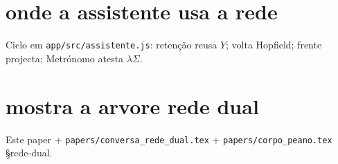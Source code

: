 \documentclass[11pt,a4paper]{article}
\newcommand{\code}[1]{\texttt{\small #1}}
\begin{document}
\section{onde a assistente usa a rede}
Ciclo em \code{app/src/assistente.js}: retenção reusa $Y$; volta Hopfield;
frente projecta; Metrónomo atesta $\lambda\Sigma$.

\section{mostra a arvore rede dual}
Este paper + \code{papers/conversa\_rede\_dual.tex} + \code{papers/corpo\_peano.tex} \S rede-dual.
\end{document}
